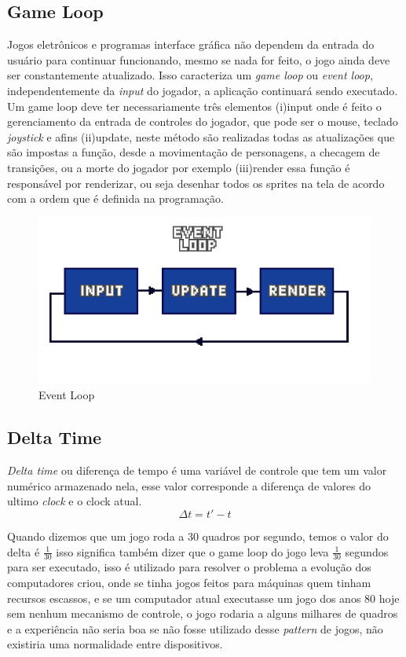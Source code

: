 \subsection{Game Loop}
Jogos eletrônicos e programas interface gráfica não dependem da entrada do usuário para continuar funcionando, mesmo se nada for feito, o jogo ainda deve ser constantemente atualizado. Isso caracteriza um \textit{game loop} ou \textit{event loop}, independentemente da \textit{input} do jogador, a aplicação continuará sendo executado.
Um game loop deve ter necessariamente três elementos (i)input onde é feito o gerenciamento da entrada de controles do jogador, que pode ser o mouse, teclado \textit{joystick} e afins (ii)update, neste método são realizadas todas as atualizações que são impostas a função, desde a movimentação de personagens, a checagem de transições, ou a morte do jogador por exemplo (iii)render essa função é responsável por renderizar, ou seja desenhar todos os sprites na tela de acordo com a ordem que é definida na programação.
\begin{figure}[h!]
    \centering
    \includegraphics[width=1\linewidth]{figuras/event-loop.png}
    \caption{Event Loop}
    \label{fig:event-loopl}
\end{figure}

\subsection{Delta Time}
 \textit{Delta time} ou diferença de tempo é uma variável de controle que tem um valor numérico armazenado nela, esse valor corresponde a diferença de valores do ultimo \textit{clock} e o clock atual.
 \begin{equation}
    \Delta t = t' - t
    \label{eq:dt_equation}
\end{equation}

 Quando dizemos que um jogo roda a 30 quadros por segundo, temos o valor do delta é \(\frac{1}{30}\) isso significa também dizer que o game loop do jogo leva \(\frac{1}{30}\) segundos para ser executado, isso é utilizado para resolver o problema a evolução dos computadores criou, onde se tinha jogos feitos para máquinas quem tinham recursos escassos, e se um computador atual executasse um jogo dos anos 80 hoje sem nenhum mecanismo de controle, o jogo rodaria a alguns milhares de quadros e a experiência não seria boa se não fosse utilizado desse \textit{pattern} de jogos, não existiria uma normalidade entre dispositivos.


